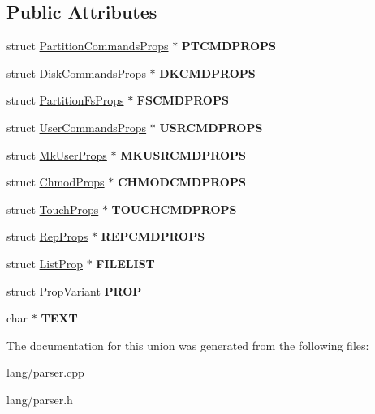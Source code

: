 \subsection*{Public Attributes}
\begin{DoxyCompactItemize}
\item 
\mbox{\label{unionYYSTYPE_aee5c8cb30473950cb4797e4f16692e13}} 
struct \hyperlink{structPartitionCommandsProps}{Partition\+Commands\+Props} $\ast$ {\bfseries P\+T\+C\+M\+D\+P\+R\+O\+PS}
\item 
\mbox{\label{unionYYSTYPE_a1f8bf7be4e2a8803f1b9d56a7091e699}} 
struct \hyperlink{structDiskCommandsProps}{Disk\+Commands\+Props} $\ast$ {\bfseries D\+K\+C\+M\+D\+P\+R\+O\+PS}
\item 
\mbox{\label{unionYYSTYPE_a17a0a65338bd94f30a3b3a98b96196dc}} 
struct \hyperlink{structPartitionFsProps}{Partition\+Fs\+Props} $\ast$ {\bfseries F\+S\+C\+M\+D\+P\+R\+O\+PS}
\item 
\mbox{\label{unionYYSTYPE_aa82020c9db3f6c43a11ccc8e5f190788}} 
struct \hyperlink{structUserCommandsProps}{User\+Commands\+Props} $\ast$ {\bfseries U\+S\+R\+C\+M\+D\+P\+R\+O\+PS}
\item 
\mbox{\label{unionYYSTYPE_a37a52627f8f812d79a7c32fee6f8cad2}} 
struct \hyperlink{structMkUserProps}{Mk\+User\+Props} $\ast$ {\bfseries M\+K\+U\+S\+R\+C\+M\+D\+P\+R\+O\+PS}
\item 
\mbox{\label{unionYYSTYPE_a899d0cb6dc31f22e1fd2ff2792136782}} 
struct \hyperlink{structChmodProps}{Chmod\+Props} $\ast$ {\bfseries C\+H\+M\+O\+D\+C\+M\+D\+P\+R\+O\+PS}
\item 
\mbox{\label{unionYYSTYPE_a4e86ad2aba2902edbfb7ca0687d40231}} 
struct \hyperlink{structTouchProps}{Touch\+Props} $\ast$ {\bfseries T\+O\+U\+C\+H\+C\+M\+D\+P\+R\+O\+PS}
\item 
\mbox{\label{unionYYSTYPE_ac360f0342757e36c16407a4d39ecc914}} 
struct \hyperlink{structRepProps}{Rep\+Props} $\ast$ {\bfseries R\+E\+P\+C\+M\+D\+P\+R\+O\+PS}
\item 
\mbox{\label{unionYYSTYPE_ace81d82c79a18e3aa42d859a06d26412}} 
struct \hyperlink{structListProp}{List\+Prop} $\ast$ {\bfseries F\+I\+L\+E\+L\+I\+ST}
\item 
\mbox{\label{unionYYSTYPE_a65f6ba013618ca3d5a033e1f94a1969b}} 
struct \hyperlink{structPropVariant}{Prop\+Variant} {\bfseries P\+R\+OP}
\item 
\mbox{\label{unionYYSTYPE_a61a79fb526a85cd54af103786554fee6}} 
char $\ast$ {\bfseries T\+E\+XT}
\end{DoxyCompactItemize}


The documentation for this union was generated from the following files\+:\begin{DoxyCompactItemize}
\item 
lang/parser.\+cpp\item 
lang/parser.\+h\end{DoxyCompactItemize}
